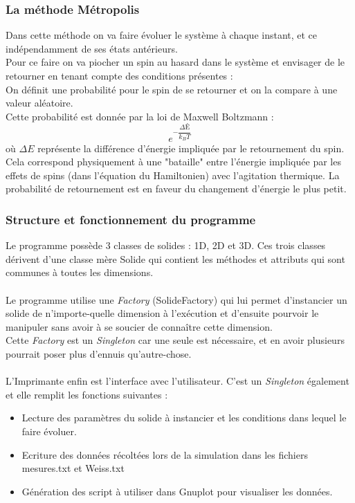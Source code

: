 \subsubsection{La méthode Métropolis}
Dans cette méthode on va faire évoluer le système à chaque instant, et ce indépendamment de ses états antérieurs.\\
Pour ce faire on va piocher un spin au hasard dans le système et envisager de le retourner en tenant compte des conditions présentes :\\
On définit une probabilité pour le spin de se retourner et on la compare à une valeur aléatoire.\\
Cette probabilité est donnée par la loi de Maxwell Boltzmann :\\
\begin{equation}
e^{- \dfrac{\Delta Ê}{k_B T}}
\end{equation}
où $\Delta E$ représente la différence d'énergie impliquée par le retournement du spin.\\
Cela correspond physiquement à une "bataille" entre l'énergie impliquée par les effets de spins (dans l'équation du Hamiltonien) avec l'agitation thermique. La probabilité de retournement est en faveur du changement d'énergie le plus petit.\\


\subsubsection{Structure et fonctionnement du programme}


Le programme possède 3 classes de solides : 1D, 2D et 3D. Ces trois classes dérivent d'une classe mère Solide qui contient les méthodes et attributs qui sont communes à toutes les dimensions.\\
\\
Le programme utilise une \emph{Factory} (SolideFactory) qui lui permet d'instancier un solide de n'importe-quelle dimension à l’exécution et d'ensuite pourvoir le manipuler sans avoir à se soucier de connaître cette dimension.\\
Cette \emph{Factory} est un \emph{Singleton} car une seule est nécessaire, et en avoir plusieurs pourrait poser plus d'ennuis qu'autre-chose.\\
\\
L'Imprimante enfin est l'interface avec l'utilisateur. C'est un \emph{Singleton} également et elle remplit les fonctions suivantes :\\
\begin{itemize}
\item Lecture des paramètres du solide à instancier et les conditions dans lequel le faire évoluer.
\item Ecriture des données récoltées lors de la simulation dans les fichiers mesures.txt et Weiss.txt
\item Génération des script à utiliser dans Gnuplot pour visualiser les données.
\end{itemize}
\vspace{\parskip} %

